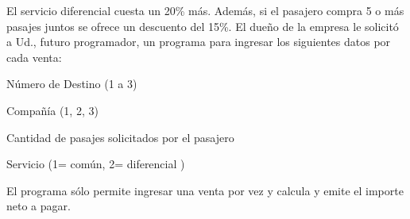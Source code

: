 \documentclass[12pt,a4paper,twoside]{article}
\begin{document}
El servicio diferencial cuesta un 20\% más.
Además, si el pasajero compra 5 o más pasajes juntos se ofrece un descuento del 15\%.
El dueño de la empresa le solicitó a Ud., futuro programador, un programa para ingresar los siguientes datos por cada venta:
\begin{list}{•}{}
\item \textbf{} Número de Destino (1 a 3)
\item \textbf{} Compañía (1, 2, 3)
\item \textbf{} Cantidad de pasajes solicitados por el pasajero
\item \textbf{} Servicio (1= común, 2= diferencial )
\end{list}
El programa sólo permite ingresar una venta por vez y calcula y emite el importe neto a pagar.

\newpage{ }
\newpage{\ }
\end{document}
